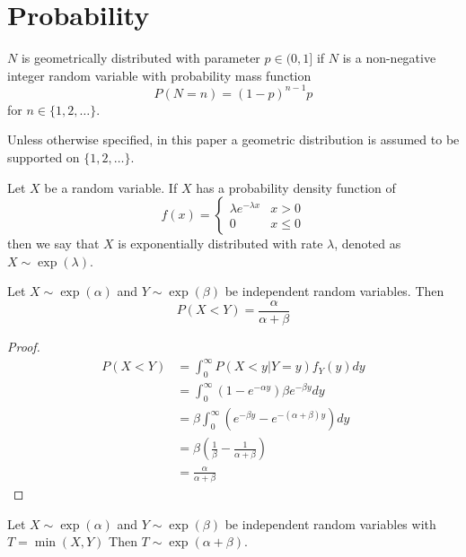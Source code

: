 \section{Probability}

\begin{defn}
$N$ is geometrically distributed with parameter $p \in (0,1]$ if $N$ is a non-negative integer random variable with probability mass function
$$
P(N = n) = (1 - p)^{n - 1} p
$$
for $n \in \{1,2,\ldots\}$.

Unless otherwise specified, in this paper a geometric distribution is assumed to be supported on $\{1,2,\ldots\}$.
\end{defn}

\begin{defn}
Let $X$ be a random variable.
If $X$ has a probability density function of
$$
f(x) = \begin{cases}
    \lambda e^{-\lambda x} & x > 0\\
    0 & x \leq 0
    \end{cases}
$$
then we say that $X$ is exponentially distributed with rate $\lambda$, denoted as $X \sim \exp(\lambda)$.
\end{defn}

\begin{theorem}\label{thm:exp_x_less_y}
Let $X \sim \exp(\alpha)$ and $Y \sim \exp(\beta)$ be independent random variables.
Then
$$
P(X < Y) = \frac{\alpha}{\alpha + \beta}
$$
\end{theorem}

\begin{proof}
\begin{align*}
    P(X < Y) &= \int_0^\infty P(X < y | Y = y) f_Y(y) dy\\
    &= \int_0^\infty (1 - e^{-\alpha y}) \beta e^{-\beta y} dy\\
    &= \beta \int_0^\infty \left( e^{-\beta y} - e^{-(\alpha + \beta) y}\right) dy\\
    &= \beta \left(\frac{1}{\beta} - \frac{1}{\alpha + \beta}\right)\\
    &= \frac{\alpha}{\alpha + \beta}
\end{align*}
\end{proof}

\begin{theorem}\label{thm:exp_t_cond}
Let $X \sim \exp(\alpha)$ and $Y \sim \exp(\beta)$ be independent random variables with $T = \min(X,Y)$
Then $T \sim \exp(\alpha + \beta)$.
\end{theorem}

